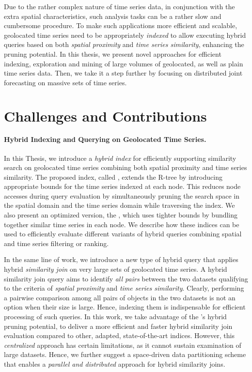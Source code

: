 Due to the rather complex nature of time series data, in conjunction with the extra spatial characteristics, such analysis tasks can be a rather slow and cumbersome procedure. To make such applications more efficient and scalable, geolocated time series need to be appropriately \textit{indexed} to allow executing hybrid queries based on both \textit{spatial proximity} and \textit{time series similarity}, enhancing the pruning potential. In this thesis, we present novel approaches for efficient indexing, exploration and mining of large volumes of geolocated, as well as plain time series data. Then, we take it a step further by focusing on distributed joint forecasting on massive sets of time series.

\section{Challenges and Contributions}
\label{subsec:challenge_contrib}

\paragraph{Hybrid Indexing and Querying on Geolocated Time Series.} In this Thesis, we introduce a \textit{hybrid index} for efficiently supporting similarity search on geolocated time series combining both spatial proximity and time series similarity. The proposed index, called \textit{\tsr}, extends the R-tree by introducing appropriate bounds for the time series indexed at each node. This reduces node accesses during query evaluation by simultaneously pruning the search space in the spatial domain and the time series domain while traversing the index. We also present an optimized version, the \btsr, which uses tighter bounds by bundling together similar time series in each node. We describe how these indices can be used to efficiently evaluate different variants of hybrid queries combining spatial and time series filtering or ranking.

In the same line of work, we introduce a new type of hybrid query that applies hybrid \textit{similarity join} on very large sets of geolocated time series. A hybrid similarity join query aims to identify \textit{all pairs} between the two datasets qualifying to the criteria of \textit{spatial proximity} and \textit{time series similarity}. Clearly, performing a pairwise comparison among all pairs of objects in the two datasets is not an option when their size is large. Hence, indexing them is indispensable for efficient processing of such queries. In this work, we take advantage of the \btsr's hybrid pruning potential, to deliver a more efficient and faster hybrid similarity join evaluation compared to other, adapted, state-of-the-art indices. However, this {\em centralized} approach has certain limitations, as it cannot sustain examination of large datasets. Hence, we further suggest a space-driven data partitioning scheme that enables a \textit{parallel and distributed} approach for hybrid similarity joins.

